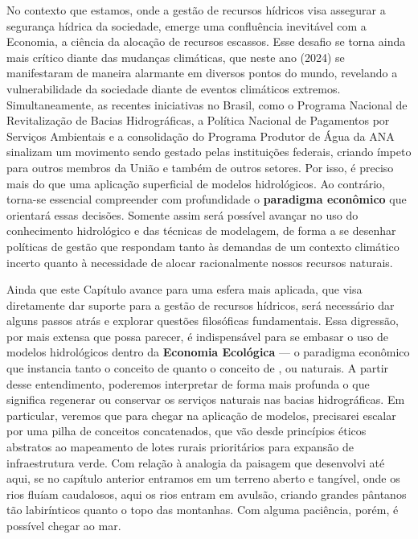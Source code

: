 \documentclass[./main.tex]{subfiles}
\begin{document}
\par No contexto que estamos, onde a gestão de recursos hídricos visa assegurar a segurança hídrica da sociedade, emerge uma confluência inevitável com a Economia, a ciência da alocação de recursos escassos. Esse desafio se torna ainda mais crítico diante das mudanças climáticas, que neste ano (2024) se manifestaram de maneira alarmante em diversos pontos do mundo, revelando a vulnerabilidade da sociedade diante de eventos climáticos extremos. Simultaneamente, as recentes iniciativas no Brasil, como o Programa Nacional de Revitalização de Bacias Hidrográficas, a Política Nacional de Pagamentos por Serviços Ambientais e a consolidação do Programa Produtor de Água da ANA sinalizam um movimento sendo gestado pelas instituições federais, criando ímpeto para outros membros da União e também de outros setores. Por isso, é preciso mais do que uma aplicação superficial de modelos hidrológicos. Ao contrário, torna-se essencial compreender com profundidade o \textbf{paradigma econômico} que orientará essas decisões. Somente assim será possível avançar no uso do conhecimento hidrológico e das técnicas de modelagem, de forma a se desenhar políticas de gestão que respondam tanto às demandas de um contexto climático incerto quanto à necessidade de alocar racionalmente nossos recursos naturais.

\par Ainda que este Capítulo avance para uma esfera mais aplicada, que visa diretamente dar suporte para a gestão de recursos hídricos, será necessário dar alguns passos atrás e explorar questões filosóficas fundamentais. Essa digressão, por mais extensa que possa parecer, é indispensável para se embasar o uso de modelos hidrológicos dentro da \textbf{Economia Ecológica} — o paradigma econômico que instancia tanto o conceito de  quanto o conceito de , ou naturais. A partir desse entendimento, poderemos interpretar de forma mais profunda o que significa regenerar ou conservar os serviços naturais nas bacias hidrográficas. Em particular, veremos que para chegar na aplicação de modelos, precisarei escalar por uma pilha de conceitos concatenados, que vão desde princípios éticos abstratos ao mapeamento de lotes rurais prioritários para expansão de infraestrutura verde. Com relação à analogia da paisagem que desenvolvi até aqui, se no capítulo anterior entramos em um terreno aberto e tangível, onde os rios fluíam caudalosos, aqui os rios entram em avulsão, criando grandes pântanos tão labirínticos quanto o topo das montanhas. Com alguma paciência, porém, é possível chegar ao mar.
\end{document}
